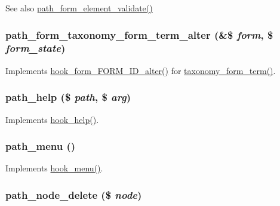 \begin{DoxySeeAlso}{See also}
\hyperlink{path_8module_a6bf1b7c5d98d593f2ca89b3f2eb199fe}{path\_\-form\_\-element\_\-validate()} 
\end{DoxySeeAlso}
\hypertarget{path_8module_ab15bd047850b30b5f4e19abadc0eaeb2}{
\subsubsection[{path\_\-form\_\-taxonomy\_\-form\_\-term\_\-alter}]{\setlength{\rightskip}{0pt plus 5cm}path\_\-form\_\-taxonomy\_\-form\_\-term\_\-alter (\&\$ {\em form}, \/  \$ {\em form\_\-state})}}
\label{path_8module_ab15bd047850b30b5f4e19abadc0eaeb2}
Implements \hyperlink{group__hooks_ga8d4a4089551493d55911bd5c4f218264}{hook\_\-form\_\-FORM\_\-ID\_\-alter()} for \hyperlink{group__forms_gadd038edd60ebd00177106bb97841803c}{taxonomy\_\-form\_\-term()}. \hypertarget{path_8module_a500b2dea361fb40f846bf92324083ec1}{
\subsubsection[{path\_\-help}]{\setlength{\rightskip}{0pt plus 5cm}path\_\-help (\$ {\em path}, \/  \$ {\em arg})}}
\label{path_8module_a500b2dea361fb40f846bf92324083ec1}
Implements \hyperlink{group__hooks_ga5589c2714a782738e8851c4c90231f0e}{hook\_\-help()}. \hypertarget{path_8module_a6c7f7ffe91d659b875298a5a51f17c99}{
\subsubsection[{path\_\-menu}]{\setlength{\rightskip}{0pt plus 5cm}path\_\-menu ()}}
\label{path_8module_a6c7f7ffe91d659b875298a5a51f17c99}
Implements \hyperlink{group__hooks_ga5c95244fea59b25666e409759e133ded}{hook\_\-menu()}. \hypertarget{path_8module_a4b474a9f9d1b6a2e456025830f0c18de}{
\subsubsection[{path\_\-node\_\-delete}]{\setlength{\rightskip}{0pt plus 5cm}path\_\-node\_\-delete (\$ {\em node})}}
